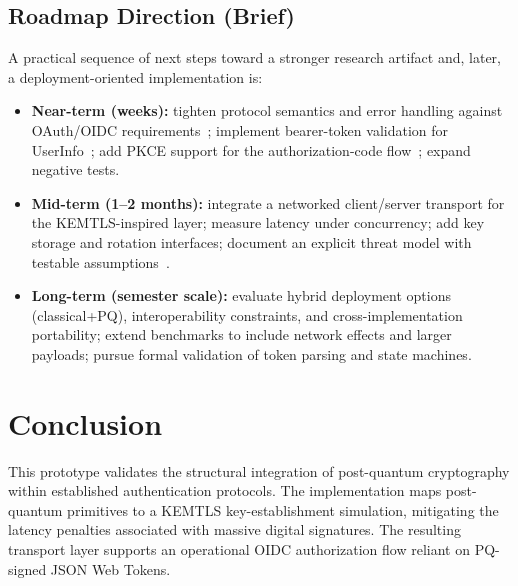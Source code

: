 \documentclass[conference]{IEEEtran}
\begin{document}
                \subsection{Roadmap Direction (Brief)}
                A practical sequence of next steps toward a stronger research artifact and, later, a deployment-oriented implementation is:
                \begin{itemize}
                  \item \textbf{Near-term (weeks):} tighten protocol semantics and error handling against OAuth/OIDC requirements~\cite{rfc6749,oidc-core}; implement bearer-token validation for UserInfo~\cite{rfc6750}; add PKCE support for the authorization-code flow~\cite{rfc7636}; expand negative tests.
                  \item \textbf{Mid-term (1--2 months):} integrate a networked client/server transport for the KEMTLS-inspired layer; measure latency under concurrency; add key storage and rotation interfaces; document an explicit threat model with testable assumptions~\cite{rfc6819}.
                  \item \textbf{Long-term (semester scale):} evaluate hybrid deployment options (classical+PQ), interoperability constraints, and cross-implementation portability; extend benchmarks to include network effects and larger payloads; pursue formal validation of token parsing and state machines.
                \end{itemize}
                \section{Conclusion}
                This prototype validates the structural integration of post-quantum cryptography within established authentication protocols. The implementation maps post-quantum primitives to a KEMTLS key-establishment simulation, mitigating the latency penalties associated with massive digital signatures. The resulting transport layer supports an operational OIDC authorization flow reliant on PQ-signed JSON Web Tokens.
                
\end{document}
